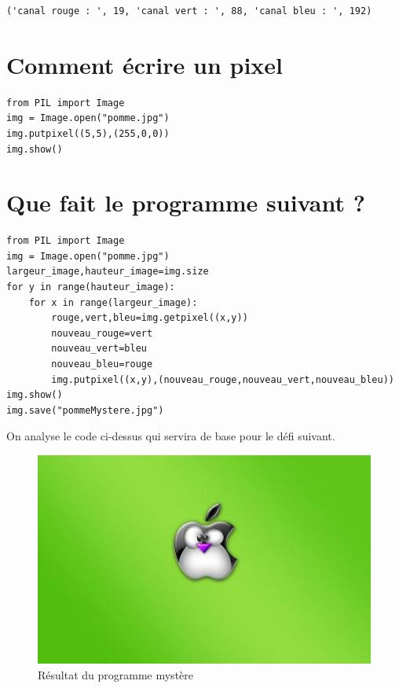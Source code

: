 \documentclass[11pt]{article}
\begin{document}
\begin{verbatim}
('canal rouge : ', 19, 'canal vert : ', 88, 'canal bleu : ', 192)
\end{verbatim}


\section{Comment écrire un pixel}
\label{sec:orgf753664}

\begin{verbatim}
from PIL import Image
img = Image.open("pomme.jpg")
img.putpixel((5,5),(255,0,0))
img.show()
\end{verbatim}


\section{Que fait le programme suivant ?}
\label{sec:org6020abd}

\begin{verbatim}
from PIL import Image
img = Image.open("pomme.jpg")
largeur_image,hauteur_image=img.size
for y in range(hauteur_image):
    for x in range(largeur_image):
        rouge,vert,bleu=img.getpixel((x,y))
        nouveau_rouge=vert
        nouveau_vert=bleu
        nouveau_bleu=rouge
        img.putpixel((x,y),(nouveau_rouge,nouveau_vert,nouveau_bleu))
img.show()
img.save("pommeMystere.jpg")
\end{verbatim}


On analyse le code ci-dessus qui servira de base pour le défi suivant.

\begin{figure}[htbp]
\centering
\includegraphics[width=.9\linewidth]{pommeMystere.jpg}
\caption{Résultat du programme mystère}
\end{figure}
\end{document}
